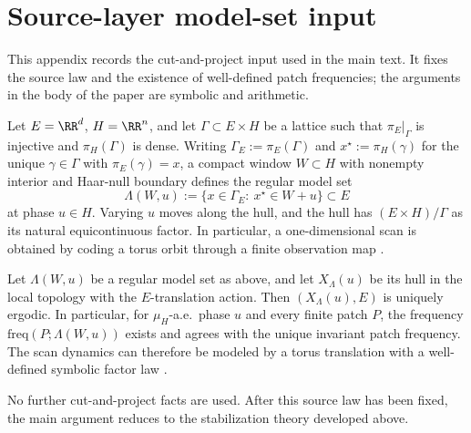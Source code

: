 \section{Source-layer model-set input}\label{sec:superspace}

This appendix records the cut-and-project input used in the main text.  It fixes the source law and the existence of well-defined patch frequencies; the arguments in the body of the paper are symbolic and arithmetic.

Let $E=\RR^d$, $H=\RR^n$, and let $\Gamma\subset E\times H$ be a lattice such that $\pi_E|_{\Gamma}$ is injective and $\pi_H(\Gamma)$ is dense. Writing $\Gamma_E:=\pi_E(\Gamma)$ and $x^\star:=\pi_H(\gamma)$ for the unique $\gamma\in\Gamma$ with $\pi_E(\gamma)=x$, a compact window $W\subset H$ with nonempty interior and Haar-null boundary defines the regular model set
\[
\Lambda(W,u):=\{x\in\Gamma_E:\ x^\star\in W+u\}\subset E
\]
at phase $u\in H$. Varying $u$ moves along the hull, and the hull has $(E\times H)/\Gamma$ as its natural equicontinuous factor. In particular, a one-dimensional scan is obtained by coding a torus orbit through a finite observation map \cite{Moody2000,BaakeGrimm2013}.

\begin{proposition}\label{prop:unique-ergodicity}
Let $\Lambda(W,u)$ be a regular model set as above, and let $X_{\Lambda}(u)$ be its hull in the local topology with the $E$-translation action. Then $(X_{\Lambda}(u),E)$ is uniquely ergodic. In particular, for $\mu_H$-a.e.\ phase $u$ and every finite patch $P$, the frequency $\mathrm{freq}(P;\Lambda(W,u))$ exists and agrees with the unique invariant patch frequency. The scan dynamics can therefore be modeled by a torus translation with a well-defined symbolic factor law \cite{Moody2000,BaakeGrimm2013}.
\end{proposition}

No further cut-and-project facts are used.  After this source law has been fixed, the main argument reduces to the stabilization theory developed above.
